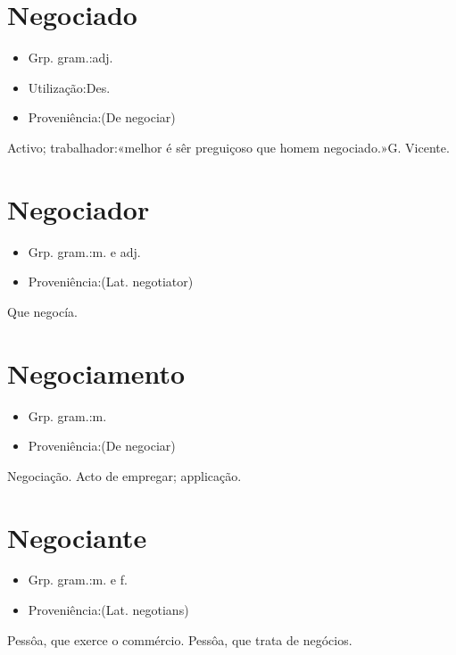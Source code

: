 \section{Negociado}
\begin{itemize}
\item {Grp. gram.:adj.}
\end{itemize}
\begin{itemize}
\item {Utilização:Des.}
\end{itemize}
\begin{itemize}
\item {Proveniência:(De \textunderscore negociar\textunderscore )}
\end{itemize}
Activo; trabalhador:«\textunderscore melhor é sêr preguiçoso que homem negociado.\textunderscore »G. Vicente.
\section{Negociador}
\begin{itemize}
\item {Grp. gram.:m.  e  adj.}
\end{itemize}
\begin{itemize}
\item {Proveniência:(Lat. \textunderscore negotiator\textunderscore )}
\end{itemize}
Que negocía.
\section{Negociamento}
\begin{itemize}
\item {Grp. gram.:m.}
\end{itemize}
\begin{itemize}
\item {Proveniência:(De \textunderscore negociar\textunderscore )}
\end{itemize}
Negociação.
Acto de empregar; applicação.
\section{Negociante}
\begin{itemize}
\item {Grp. gram.:m.  e  f.}
\end{itemize}
\begin{itemize}
\item {Proveniência:(Lat. \textunderscore negotians\textunderscore )}
\end{itemize}
Pessôa, que exerce o commércio.
Pessôa, que trata de negócios.
